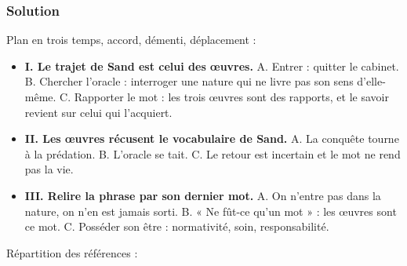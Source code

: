 \documentclass[11pt,a4paper]{article}
\providecommand{\tightlist}{\setlength{\itemsep}{0pt}\setlength{\parskip}{0pt}}
\begin{document}
\hypertarget{solution-2}{%
\subsubsection{Solution}\label{solution-2}}

Plan en trois temps, accord, démenti, déplacement :

\begin{itemize}
\tightlist
\item
  \textbf{I. Le trajet de Sand est celui des œuvres.} A. Entrer : quitter le cabinet. B. Chercher l'oracle : interroger une nature qui ne livre pas son sens d'elle-même. C. Rapporter le mot : les trois œuvres sont des rapports, et le savoir revient sur celui qui l'acquiert.
\item
  \textbf{II. Les œuvres récusent le vocabulaire de Sand.} A. La conquête tourne à la prédation. B. L'oracle se tait. C. Le retour est incertain et le mot ne rend pas la vie.
\item
  \textbf{III. Relire la phrase par son dernier mot.} A. On n'entre pas dans la nature, on n'en est jamais sorti. B. « Ne fût-ce qu'un mot » : les œuvres sont ce mot. C. Posséder son être : normativité, soin, responsabilité.
\end{itemize}

Répartition des références :
\end{document}
